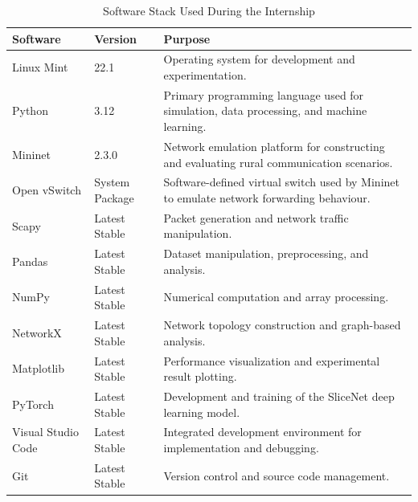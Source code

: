 \documentclass[12pt,a4paper]{report}
\begin{document}
\begin{table}[H]
	\centering
	\caption{Software Stack Used During the Internship}
	\label{tab:software}
	
	\begin{tabular}{|p{3.5cm}|p{3cm}|p{8cm}|}
		\hline
		
		\textbf{Software} &
		\textbf{Version} &
		\textbf{Purpose}
		\\
		\hline
		
		Linux Mint &
		22.1 &
		Operating system for development and experimentation.
		\\
		\hline
		
		Python &
		3.12 &
		Primary programming language used for simulation, data processing, and machine learning.
		\\
		\hline
		
		Mininet &
		2.3.0 &
		Network emulation platform for constructing and evaluating rural communication scenarios.
		\\
		\hline
		
		Open vSwitch &
		System Package &
		Software-defined virtual switch used by Mininet to emulate network forwarding behaviour.
		\\
		\hline
		
		Scapy &
		Latest Stable &
		Packet generation and network traffic manipulation.
		\\
		\hline
		
		Pandas &
		Latest Stable &
		Dataset manipulation, preprocessing, and analysis.
		\\
		\hline
		
		NumPy &
		Latest Stable &
		Numerical computation and array processing.
		\\
		\hline
		
		NetworkX &
		Latest Stable &
		Network topology construction and graph-based analysis.
		\\
		\hline
		
		Matplotlib &
		Latest Stable &
		Performance visualization and experimental result plotting.
		\\
		\hline
		
		PyTorch &
		Latest Stable &
		Development and training of the SliceNet deep learning model.
		\\
		\hline
		
		Visual Studio Code &
		Latest Stable &
		Integrated development environment for implementation and debugging.
		\\
		\hline
		
		Git &
		Latest Stable &
		Version control and source code management.
		\\
		\hline
		
	\end{tabular}
	
\end{table}
\end{document}
